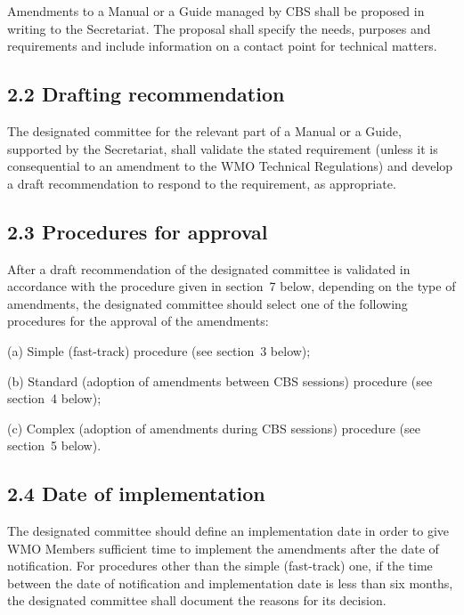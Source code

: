 Amendments to a Manual or a Guide managed by CBS shall be proposed in writing to the Secretariat. The proposal shall specify the needs, purposes and requirements and include information on a contact point for technical matters.

\hypertarget{drafting-recommendation}{%
\subsection{2.2 Drafting recommendation}\label{drafting-recommendation}}

The designated committee for the relevant part of a Manual or a Guide, supported by the Secretariat, shall validate the stated requirement (unless it is consequential to an amendment to the WMO Technical Regulations) and develop a draft recommendation to respond to the requirement, as appropriate.

\hypertarget{procedures-for-approval}{%
\subsection{2.3 Procedures for approval}\label{procedures-for-approval}}

After a draft recommendation of the designated committee is validated in accordance with the procedure given in section~7 below, depending on the type of amendments, the designated committee should select one of the following procedures for the approval of the amendments:

(a) Simple (fast-track) procedure (see section~3 below);

(b) Standard (adoption of amendments between CBS sessions) procedure (see section~4 below);

(c) Complex (adoption of amendments during CBS sessions) procedure (see section~5 below).

\hypertarget{date-of-implementation}{%
\subsection{2.4 Date of implementation}\label{date-of-implementation}}

The designated committee should define an implementation date in order to give WMO Members sufficient time to implement the amendments after the date of notification. For procedures other than the simple (fast-track) one, if the time between the date of notification and implementation date is less than six months, the designated committee shall document the reasons for its decision.

